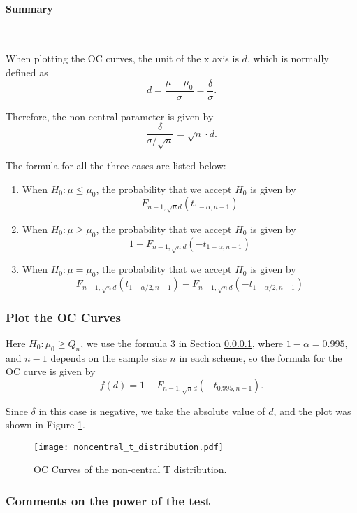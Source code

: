 \documentclass[conf]{new-aiaa}
\begin{document}
\paragraph{Summary}\label{allf}\ \medskip

When plotting the OC curves, the unit of the x axis is $d$, which is normally defined as
$$
    d = \frac{\mu - \mu_0}{\sigma} = \frac{\delta}{\sigma}.
$$

Therefore, the non-central parameter is given by $$ \dfrac{\delta}{\sigma / \sqrt{n}} = \sqrt{n}\cdot d.$$ 

The formula for all the three cases are listed below: \medskip

\begin{enumerate}
    \item When $H_0:\mu\leqslant\mu_0$, the probability that we accept $H_0$ is given by \\
    $$F_{n-1, \sqrt{n}d}(t_{1-\alpha, n-1})$$
    \item When $H_0:\mu\geqslant\mu_0$, the probability that we accept $H_0$ is given by\\
    $$1- F_{n-1, \sqrt{n}d}(-t_{1-\alpha, n-1})$$
    \item When $H_0:\mu=\mu_0$, the probability that we accept $H_0$ is given by \\
    $$ F_{n-1, \sqrt{n}d}(t_{1-\alpha/2, n-1}) - F_{n-1,\sqrt{n}d}(-t_{1-\alpha/2, n-1})$$
\end{enumerate}

\subsubsection{Plot the OC Curves}

Here $H_0:\mu_0\geqslant Q_n$, we use the formula 3 in Section \ref{allf}, where $1-\alpha=0.995$, and $n-1$ depends on the sample size $n$ in each scheme, so the formula for the OC curve is given by
$$f(d)=1- F_{n-1, \sqrt{n}d}(-t_{0.995, n-1}).$$

Since $\delta$ in this case is negative, we take the absolute value of $d$, and the plot was shown in Figure \ref{fig:oc_curve}.

\begin{figure}[H]
    \centering
    \texttt{[image: noncentral\_t\_distribution.pdf]}
    \caption{OC Curves of the non-central T distribution.}
    \label{fig:oc_curve}
\end{figure}

\subsubsection{Comments on the power of the test}
\end{document}
